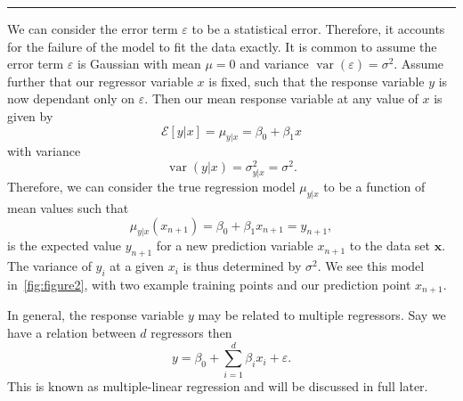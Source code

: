 \documentclass[10pt,a4paper, twocolumn, conference]{IEEEtran}
\DeclareMathOperator{\var}{var}
\begin{document}
\hrule
\vspace{3mm}
We can consider the error term $\varepsilon$ to be a statistical error. Therefore, it accounts for the failure of the model to fit the data exactly. It is common to assume the error term $\varepsilon$ is Gaussian with mean $\mu = 0$ and variance $\var(\varepsilon) = \sigma^2$. Assume further that our regressor variable $x$ is fixed, such that the response variable $y$ is now dependant only on $\varepsilon$. Then our mean response variable at any value of $x$ is given by
\begin{equation}
\mathcal{E}[y|x] = \mu_{y|x} = \beta_0 + \beta_1 x
\end{equation}
with variance
\begin{equation}
\var(y|x) = \sigma_{y|x}^2 = \sigma^2.
\end{equation}
Therefore, we can consider the true regression model $\mu_{y|x}$ to be a function of mean values such that
\begin{equation}
\mu_{y|x}(x_{n+1}) = \beta_0 + \beta_1 x_{n+1} = y_{n+1},
\end{equation}
is the expected value $y_{n+1}$ for a new prediction variable $x_{n+1}$ to the data set $\mathbf{x}$. The variance of $y_i$ at a given $x_i$ is thus determined by $\sigma^2$. We see this model in~\cref{fig:figure2}, with two example training points and our prediction point $x_{n+1}$.

In general, the response variable $y$ may be related to multiple regressors. Say we have a relation between $d$ regressors then
\begin{equation}
y = \beta_0 + \sum_{i = 1}^d \beta_i x_i + \varepsilon.
\end{equation}
This is known as multiple-linear regression and will be discussed in full later.
\end{document}
